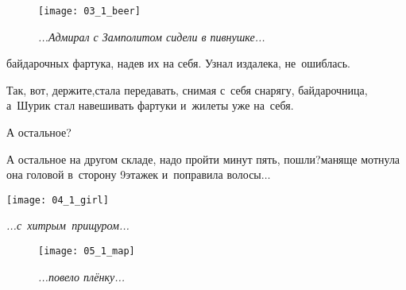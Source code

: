 \begin{figure}[h]
	\centering
	\texttt{[image: 03\_1\_beer]}
	\caption{\small\textit{...Адмирал с Замполитом сидели в пивнушке...}}
\end{figure}

\newpage

\noindent
\begin{minipage}{0.55\textwidth}
	\setlength{\parindent}{1.0cm}  %
	\setlength{\parskip}{0.25cm}     %
	
	\noindent байдарочных фартука, надев их на себя. Узнал издалека, не~ошиблась.
	
	\diagdash Так, вот, держите,\mdash стала передавать, снимая с~себя снарягу, байдарочница, а~Шурик стал навешивать фартуки и~жилеты уже на~себя.
	
	\diagdash А остальное?	
	
	\diagdash А остальное на другом складе, надо пройти минут пять, пошли?\mdash маняще мотнула она головой в~сторону 9\sdash этажек и~поправила волосы$\ldots$
\end{minipage}\hfill
\begin{minipage}{0.40\textwidth}
	\centering
	\texttt{[image: 04\_1\_girl]}
	
	{\small\textit{...с~хитрым~прищуром...}}
\end{minipage}

\newpage

%
%
%

\begin{wrapfigure}[11]{l}{0.49\textwidth}
	\centering	
	\texttt{[image: 05\_1\_map]}
	\caption{\small\textit{...повело плёнку...}}
\end{wrapfigure}

